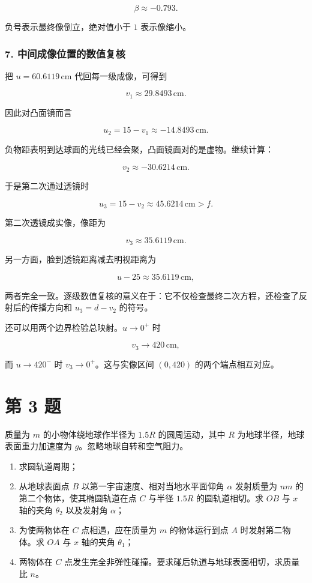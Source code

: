 \documentclass[12pt,a4paper,UTF8]{ctexart}
\newcommand{\tightlist}{\setlength{\itemsep}{0pt}\setlength{\parskip}{0pt}}
\begin{document}
\[
\boxed{\beta\approx-0.793}.
\]

负号表示最终像倒立，绝对值小于 \(1\) 表示像缩小。

\subsubsection{7.
中间成像位置的数值复核}\label{ux4e2dux95f4ux6210ux50cfux4f4dux7f6eux7684ux6570ux503cux590dux6838}

把 \(u=60.6119\,\mathrm{cm}\) 代回每一级成像，可得到

\[
v_1\approx29.8493\,\mathrm{cm}.
\]

因此对凸面镜而言

\[
u_2=15-v_1\approx-14.8493\,\mathrm{cm}.
\]

负物距表明到达球面的光线已经会聚，凸面镜面对的是虚物。继续计算：

\[
v_2\approx-30.6214\,\mathrm{cm}.
\]

于是第二次通过透镜时

\[
u_3=15-v_2\approx45.6214\,\mathrm{cm}>f.
\]

第二次透镜成实像，像距为

\[
v_3\approx35.6119\,\mathrm{cm}.
\]

另一方面，脸到透镜距离减去明视距离为

\[
u-25\approx35.6119\,\mathrm{cm},
\]

两者完全一致。逐级数值复核的意义在于：它不仅检查最终二次方程，还检查了反射后的传播方向和
\(u_3=d-v_2\) 的符号。

还可以用两个边界检验总映射。\(u\to0^+\) 时

\[
v_3\to420\,\mathrm{cm},
\]

而 \(u\to420^-\) 时 \(v_3\to0^+\)。这与实像区间 \((0,420)\)
的两个端点相互对应。

\newpage

\section{第 3 题}\label{ux7b2c-3-ux9898}

质量为 \(m\) 的小物体绕地球作半径为 \(1.5R\) 的圆周运动，其中 \(R\)
为地球半径，地球表面重力加速度为 \(g\)。忽略地球自转和空气阻力。

\begin{enumerate}
\def\labelenumi{\arabic{enumi}.}
\tightlist
\item
  求圆轨道周期；
\item
  从地球表面点 \(B\) 以第一宇宙速度、相对当地水平面仰角 \(\alpha\)
  发射质量为 \(nm\) 的第二个物体，使其椭圆轨道在点 \(C\) 与半径 \(1.5R\)
  的圆轨道相切。求 \(OB\) 与 \(x\) 轴的夹角 \(\theta_2\) 以及发射角
  \(\alpha\)；
\item
  为使两物体在 \(C\) 点相遇，应在质量为 \(m\) 的物体运行到点 \(A\)
  时发射第二物体。求 \(OA\) 与 \(x\) 轴的夹角 \(\theta_1\)；
\item
  两物体在 \(C\)
  点发生完全非弹性碰撞。要求碰后轨道与地球表面相切，求质量比 \(n\)。
\end{enumerate}
\end{document}

